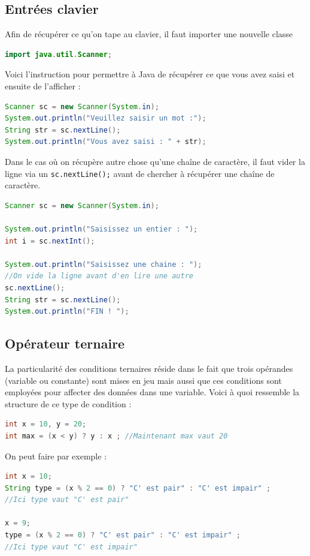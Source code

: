 \documentclass[a4paper,twoside]{article}
\begin{document}
\subsection{Entrées clavier}
Afin de récupérer ce qu'on tape au clavier, il faut importer une nouvelle classe
\begin{lstlisting}[language=java]
import java.util.Scanner;
\end{lstlisting}

\bigskip

Voici l'instruction pour permettre à Java de récupérer ce que vous avez saisi et ensuite de l'afficher :
\begin{lstlisting}[language=java]
Scanner sc = new Scanner(System.in);
System.out.println("Veuillez saisir un mot :");
String str = sc.nextLine();
System.out.println("Vous avez saisi : " + str);
\end{lstlisting}

\bigskip

Dans le cas où on récupère autre chose qu'une chaîne de caractère, il faut vider la ligne via un \texttt{sc.nextLine();} avant de chercher à récupérer une chaîne de caractère.
\begin{lstlisting}[language=java]
Scanner sc = new Scanner(System.in);

System.out.println("Saisissez un entier : ");
int i = sc.nextInt();

System.out.println("Saisissez une chaine : ");
//On vide la ligne avant d'en lire une autre
sc.nextLine();
String str = sc.nextLine();
System.out.println("FIN ! ");
\end{lstlisting}

\subsection{Opérateur ternaire}
La particularité des conditions ternaires réside dans le fait que trois opérandes (variable ou constante) sont mises en jeu mais aussi que ces conditions sont employées pour affecter des données dans une variable. Voici à quoi ressemble la structure de ce type de condition :
\begin{lstlisting}[language=java]
int x = 10, y = 20;
int max = (x < y) ? y : x ; //Maintenant max vaut 20
\end{lstlisting}

On peut faire par exemple : 
\begin{lstlisting}[language=java]
int x = 10;
String type = (x % 2 == 0) ? "C' est pair" : "C' est impair" ; 
//Ici type vaut "C' est pair"

x = 9;
type = (x % 2 == 0) ? "C' est pair" : "C' est impair" ; 
//Ici type vaut "C' est impair"
\end{lstlisting}
\end{document}
